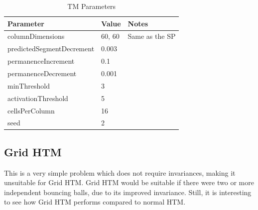 \begin{table}[H]
    \centering
    \begin{tabularx}{\linewidth}{@{}llX@{}}
        \toprule
        \textbf{Parameter}        & \textbf{Value} & \textbf{Notes} \\
        \midrule
        columnDimensions          & 60, 60         & Same as the SP \\
        predictedSegmentDecrement & 0.003          &                \\
        permanenceIncrement       & 0.1            &                \\
        permanenceDecrement       & 0.001          &                \\
        minThreshold              & 3              &                \\
        activationThreshold       & 5              &                \\
        cellsPerColumn            & 16             &                \\
        seed                      & 2              &                \\
        \bottomrule
    \end{tabularx}

    \caption{TM Parameters}
    \label{tab:bb_TM_params}
\end{table}
\subsection{Grid HTM}
This is a very simple problem which does not require invariances, making it unsuitable for Grid HTM. Grid HTM would be suitable if there were two or more independent bouncing balls, due to its improved invariance. Still, it is interesting to see how Grid HTM performs compared to normal HTM.
